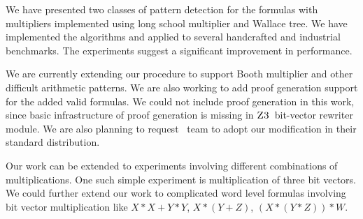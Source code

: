 We have presented two classes of pattern detection for the formulas with
multipliers implemented using long school multiplier and Wallace tree.
%
We have implemented the algorithms and applied to several handcrafted and 
industrial benchmarks.
%
The experiments suggest a significant improvement in performance.

We are currently extending our procedure to support Booth multiplier
and other difficult arithmetic patterns.
%
We are also working to add proof generation support
for the added valid formulas.
%
We could not include proof generation in this work, since basic infrastructure
of proof generation is missing in $\textsc{Z3}$~bit-vector rewriter module.
%
We are also planning to request \zthree~team to adopt our modification in their
standard distribution.


Our work can be extended to experiments involving different combinations of multiplications. One such simple experiment is multiplication of three bit vectors. We could further extend our work to complicated word level formulas involving bit vector multiplication like $X*X + Y*Y$, $X*(Y+Z)$, $(X*(Y*Z))*W$.





